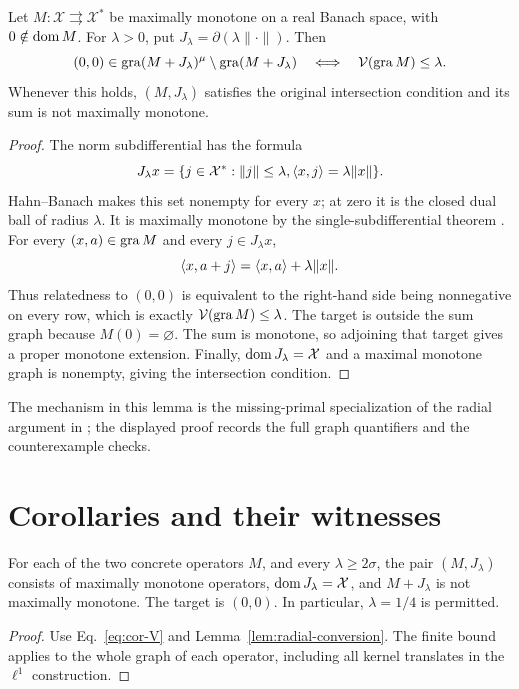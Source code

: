 \begin{lemma}\label{lem:radial-conversion}
Let $M:\mathcal X\rightrightarrows\mathcal X^*$ be maximally monotone
on a real Banach space, with $0\notin\operatorname{dom} M$. For $\lambda>0$, put
$J_\lambda=\partial(\lambda\|\cdot\|)$. Then
\begin{equation}
(0,0)\in\operatorname{gra}(M+J_\lambda)^\mu\setminus\operatorname{gra}(M+J_\lambda)
\quad\Longleftrightarrow\quad
\mathcal V(\operatorname{gra} M)\le\lambda.
\label{eq:cor-exact-radial}
\end{equation}
Whenever this holds, $(M,J_\lambda)$ satisfies the original intersection
condition and its sum is not maximally monotone.
\end{lemma}
\begin{proof}
The norm subdifferential has the formula
\[
J_\lambda x=\{j\in\mathcal X^*: \|j\|\le\lambda,
                         \langle x,j\rangle=\lambda\|x\|\}.
\]
Hahn--Banach makes this set nonempty for every $x$; at zero it is the
closed dual ball of radius $\lambda$. It is maximally monotone by the
single-subdifferential theorem \cite[Theorem~A]{rockafellar1970subdiff}.
For every $(x,a)\in\operatorname{gra} M$ and every $j\in J_\lambda x$,
\[
\langle x,a+j\rangle=\langle x,a\rangle+\lambda\|x\|.
\]
Thus relatedness to $(0,0)$ is equivalent to the right-hand side being
nonnegative on every row, which is exactly
$\mathcal V(\operatorname{gra} M)\le\lambda$. The target is outside the sum graph
because $M(0)=\varnothing$. The sum is monotone, so adjoining that target
gives a proper monotone extension. Finally, $\operatorname{dom} J_\lambda=\mathcal X$
and a maximal monotone graph is nonempty, giving the intersection condition.
\end{proof}
The mechanism in this lemma is the missing-primal specialization of the
radial argument in \cite[Theorem~1.2, proof]{verona2008}; the displayed
proof records the full graph quantifiers and the counterexample checks.

\section{Corollaries and their witnesses}
\begin{corollary}\label{cor:radial}
For each of the two concrete operators $M$, and every $\lambda\ge2\sigma$,
the pair $(M,J_\lambda)$ consists of maximally monotone operators,
$\operatorname{dom} J_\lambda=\mathcal X$, and $M+J_\lambda$ is not maximally monotone.
The target is $(0,0)$. In particular, $\lambda=1/4$ is permitted.
\end{corollary}
\begin{proof}
Use Eq.~\eqref{eq:cor-V} and Lemma~\ref{lem:radial-conversion}.
The finite bound applies to the whole graph of each operator, including
all kernel translates in the $\ell^1$ construction.
\end{proof}

